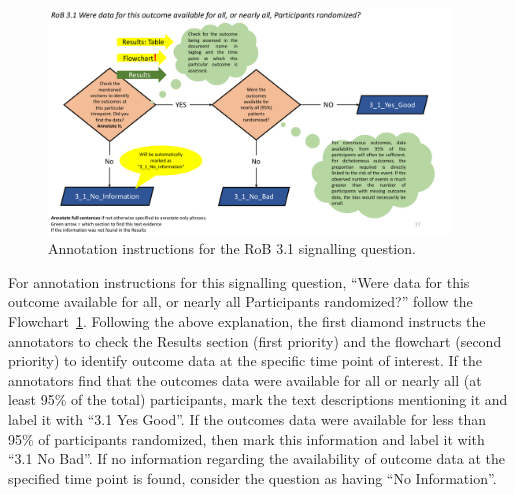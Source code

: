 \documentclass[sn-mathphys,Numbered]{sn-jnl}%
\begin{document}
%
%
%
\begin{figure}[hbt]
    \centering
    \includegraphics[width=0.95\textwidth]{figures/3_1.pdf}
    \caption{Annotation instructions for the RoB 3.1 signalling question.}
    \label{fig:3_1}
\end{figure}
%
%
%


For annotation instructions for this signalling question, ``Were data for this outcome available for all, or nearly all Participants randomized?'' follow the Flowchart~\ref{fig:3_1}.
Following the above explanation, the first diamond instructs the annotators to check the Results section (first priority) and the flowchart (second priority) to identify outcome data at the specific time point of interest.
If the annotators find that the outcomes data were available for all or nearly all (at least 95\% of the total) participants, mark the text descriptions mentioning it and label it with ``3.1 Yes Good''.
If the outcomes data were available for less than 95\% of participants randomized, then mark this information and label it with ``3.1 No Bad''.
If no information regarding the availability of outcome data at the specified time point is found, consider the question as having ``No Information''.
%
%
%
\end{document}
